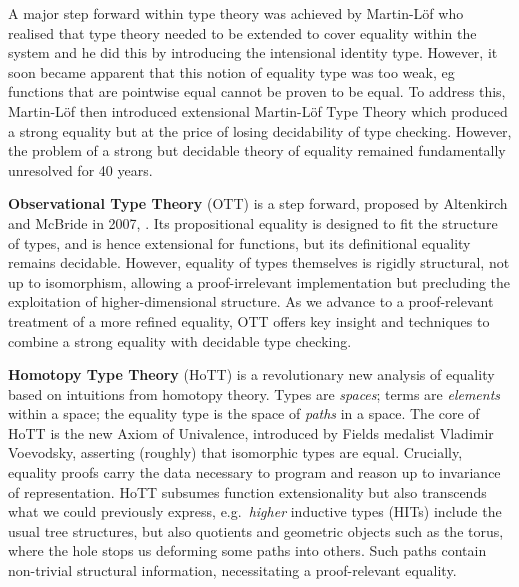 \documentclass[a4paper,11pt]{article}
\begin{document}
A major step forward within type theory was achieved by Martin-L\"of
who realised that type theory needed to be extended to cover equality
within the system and he did this by introducing the intensional identity type.
However, it soon became apparent that this notion of equality type was
too weak, eg functions that are pointwise equal cannot be proven to
be equal. To address this, Martin-L\"of then introduced extensional
Martin-L\"of Type Theory which produced a strong equality but at the price of
losing decidability of type checking. However, the problem of a strong but
decidable theory of equality remained fundamentally unresolved for 40
years. 

{\bf Observational Type Theory} (OTT) is a step forward, proposed by
Altenkirch and McBride in 2007, \cite{alti:ott-conf}. Its propositional equality is designed
to fit the structure of types, and is hence extensional for functions,
but its definitional equality remains decidable. However, equality of
types themselves is rigidly structural, not up to isomorphism,
allowing a proof-irrelevant implementation but precluding the
exploitation of higher-dimensional structure. As we advance to a
proof-relevant treatment of a more refined equality, OTT offers key
insight and techniques to combine a strong equality with decidable
type checking.





{\bf Homotopy Type Theory} (HoTT) is a revolutionary new analysis of
equality based on intuitions from homotopy theory. Types are \emph{spaces};
terms are \emph{elements} within a space; the equality type is the space of
\emph{paths} in a space. The core of HoTT is the new Axiom of Univalence,
introduced by Fields medalist Vladimir Voevodsky, asserting (roughly)
that isomorphic types are equal. Crucially, equality proofs carry
the data necessary to program and reason up to invariance of
representation. HoTT subsumes function extensionality but also
transcends what we could previously express, e.g.\ \emph{higher}
inductive types (HITs) include the usual tree structures, but
also quotients and geometric objects such as the torus, where the hole
stops us deforming some paths into others. Such paths contain
non-trivial structural information, necessitating a proof-relevant equality.
\end{document}

